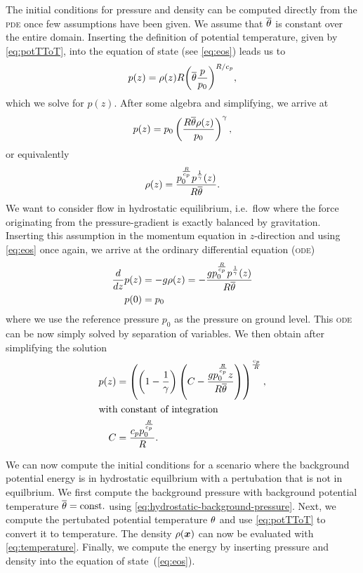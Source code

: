 The initial conditions for pressure and density can be computed directly from the \textsc{pde} once few assumptions have been given.
We assume that $\overline{\theta}$ is constant over the entire domain.
Inserting the definition of potential temperature, given by \cref{eq:potTToT}, into the equation of state (see \cref{eq:eos}) leads us to
\begin{equation}
  p(z) = \rho(z) R {\left( \overline{\theta} \frac{p}{p_0}\right)}^{R/c_p},
\end{equation}
which we solve for $p(z)$.
After some algebra and simplifying, we arrive at
\begin{equation}
 p(z) = p_0 \left( \frac{R \overline{\theta} \rho(z)}{p_0} \right)^{\gamma},
\end{equation}
or equivalently
\begin{equation}
  \label{eq:eos-potT}
\rho(z) = \frac{p_{0}^{\frac{R}{c_{p}}} p^{\frac{1}{\gamma}}{\left (z \right )}}{R \overline{\theta}}.
\end{equation}
We want to consider flow in hydrostatic equilibrium, i.e.\ flow where the force originating from the pressure-gradient is exactly balanced by gravitation.
Inserting this assumption in the momentum equation in $z$-direction and using \cref{eq:eos} once again, we arrive at the ordinary differential equation (\textsc{ode})
\begin{align}
  \label{eq:hydrostatic-balance-potT}
  \begin{split}
  \frac{d}{d z} p{\left (z \right )} &= -g \rho(z)
                                     = 
        - \frac{g p_{0}^{\frac{R}{c_{p}}} p^{\frac{1}{\gamma}}{\left (z \right )}}{R \overline{\theta}}\\
  p{\left (0 \right )} &= p_0
  \end{split}
\end{align}
where we use the reference pressure $p_0$ as the pressure on ground level.
This \textsc{ode} can be now simply solved by separation of variables.
We then obtain after simplifying the solution
\begin{align}
  \label{eq:hydrostatic-background-pressure}
p(z) &= \left(\left(1 - \frac{1}{\gamma}\right) \left(C - \frac{g p_{0}^{\frac{R}{c_{p}}} z}{R \overline{\theta}}\right)\right)^{\frac{c_{p}}{R}},\\
\shortintertext{with constant of integration}
 C &= \frac{c_{p} p_{0}^{\frac{R}{c_{p}}}}{R}.
\end{align}

We can now compute the initial conditions for a scenario where the background potential energy is in hydrostatic equilbrium with a pertubation that is not in equilbrium.
We first compute the background pressure with background potential temperature $\overline{\theta} = \text{const.}$ using \cref{eq:hydrostatic-background-pressure}.
Next, we compute the pertubated potential temperature $\theta$ and use \cref{eq:potTToT} to convert it to temperature.
The density $\rho(\bm{x})$ can now be evaluated with \cref{eq:temperature}.
Finally, we compute the energy by inserting pressure and density into the equation of state~(\ref{eq:eos}).

